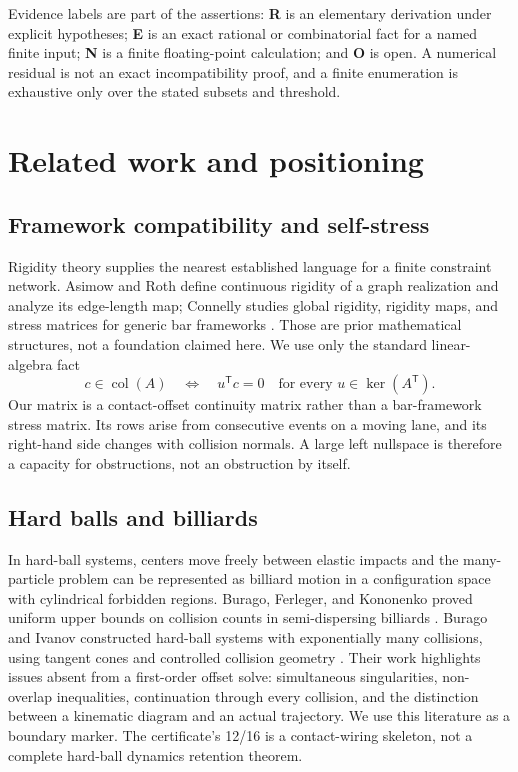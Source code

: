 \documentclass[11pt]{article}
\theoremstyle{definition}
\theoremstyle{remark}
\newcommand{\T}{\mathsf T}
\newcommand{\col}{\operatorname{col}}
\newcommand{\kerp}{\operatorname{ker}}
\begin{document}
Evidence labels are part of the assertions: \textbf{R} is an elementary derivation under explicit hypotheses; \textbf{E} is an exact rational or combinatorial fact for a named finite input; \textbf{N} is a finite floating-point calculation; and \textbf{O} is open. A numerical residual is not an exact incompatibility proof, and a finite enumeration is exhaustive only over the stated subsets and threshold.

\section{Related work and positioning}

\subsection{Framework compatibility and self-stress}
Rigidity theory supplies the nearest established language for a finite constraint network. Asimow and Roth define continuous rigidity of a graph realization and analyze its edge-length map; Connelly studies global rigidity, rigidity maps, and stress matrices for generic bar frameworks \cite{asimow1978,connelly2005}. Those are prior mathematical structures, not a foundation claimed here. We use only the standard linear-algebra fact
\[
 c\in\col(A)\quad\Longleftrightarrow\quad u^\T c=0\quad\text{for every }u\in\kerp(A^\T).
\]
Our matrix is a contact-offset continuity matrix rather than a bar-framework stress matrix. Its rows arise from consecutive events on a moving lane, and its right-hand side changes with collision normals. A large left nullspace is therefore a capacity for obstructions, not an obstruction by itself.

\subsection{Hard balls and billiards}
In hard-ball systems, centers move freely between elastic impacts and the many-particle problem can be represented as billiard motion in a configuration space with cylindrical forbidden regions. Burago, Ferleger, and Kononenko proved uniform upper bounds on collision counts in semi-dispersing billiards \cite{burago1998}. Burago and Ivanov constructed hard-ball systems with exponentially many collisions, using tangent cones and controlled collision geometry \cite{burago2021}. Their work highlights issues absent from a first-order offset solve: simultaneous singularities, non-overlap inequalities, continuation through every collision, and the distinction between a kinematic diagram and an actual trajectory. We use this literature as a boundary marker. The certificate's 12/16 is a contact-wiring skeleton, not a complete hard-ball dynamics retention theorem.
\end{document}
